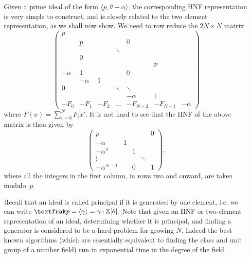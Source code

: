 Given a prime ideal of the form $\langle p, \theta - \alpha \rangle$, the corresponding HNF representation is very simple to construct, and is closely related to the two element	representation, as we shall now show. 
We need to row reduce the $2N \times N$ matrix
\[
\begin{pmatrix}
p & & & & & &\\
& p & & & 0 & &\\
& & & \ddots & & &\\
& 0 & & & & &\\
& & & & & p &\\
-\alpha & 1 & & & 0 & &\\
& -\alpha & 1 & & & &\\
0 & & & \ddots & \ddots & &\\
& & & & -\alpha & 1 &\\
-F_0 & -F_1 & -F_2 & \ldots & -F_{N-2} & -F_{N-1} & -\alpha
\end{pmatrix}
\]
where $F(x) = \sum_{i=0}^{N}F_i x^i$. It is not hard to see that the HNF of the above matrix is then given by
\[
\begin{pmatrix}
p & & & & 0\\
-\alpha& 1 & & &\\
-\alpha^2 & & 1 & &\\
\vdots & & & \ddots &\\
-\alpha^{N-1} & & 0 & & 1
\end{pmatrix},
\]
where all the integers in the first column, in rows two and onward, are taken modulo~$p$.

Recall that an ideal is called principal if it is generated by one element, i.e. we can write $\tfr{p} = \langle \gamma \rangle = \gamma \cdot \bb{Z}[\theta]$.
Note that given an HNF or two-element representation of an ideal, determining whether it is principal, and finding a generator is considered to be a hard problem for growing $N$. 
Indeed the best known algorithms (which are essentially equivalent to finding the class and unit group of a number field) run in exponential time in the degree of the field.
